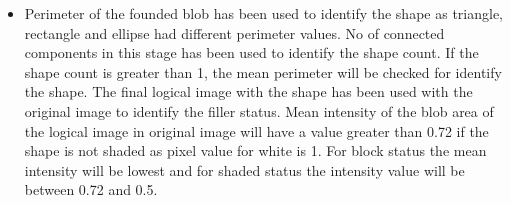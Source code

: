 \begin{itemize}
	\item Perimeter of the founded blob has been used to identify the shape as triangle, rectangle and ellipse had different perimeter values. No of connected components in this stage has been used to identify the shape count. If the shape count is greater than 1, the mean perimeter will be checked for identify the shape. The final logical image with the shape has been used with the original image to identify the filler status. Mean intensity of the blob area of the logical image in original image will have a value greater than 0.72 if the shape is not shaded as pixel value for white is 1. For block status the mean intensity will be lowest and for shaded status the intensity value will be between 0.72 and 0.5.
	
	
\end{itemize}
	